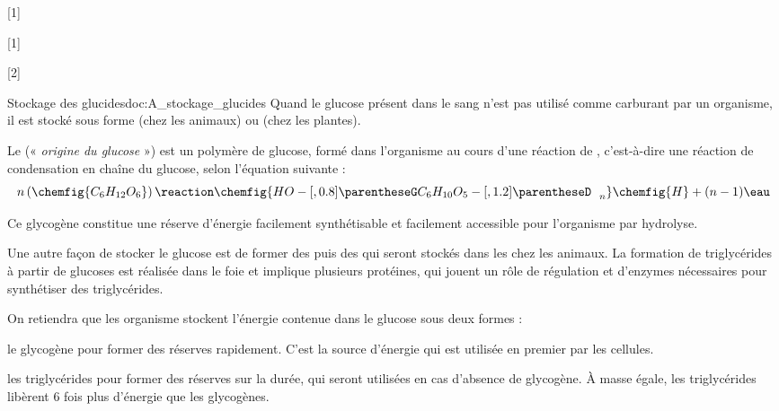[1]

[1]

[2]

\begin{doc}{Stockage des glucides}{doc:A_stockage_glucides}
  Quand le glucose présent dans le sang n'est pas utilisé comme carburant par un organisme, il est stocké sous forme  (chez les animaux) ou  (chez les plantes).

  Le  (« \textit{origine du glucose} ») est un polymère de glucose, formé dans l'organisme au cours d'une réaction de , c'est-à-dire une réaction de condensation en chaîne du glucose, selon l'équation suivante :
  \begin{equation*}
    n \left(\chemfig{C_6 H_{12} O_6}\right) \reaction
    \chemfig{HO-[,0.8] \parentheseG C_6 H_{10} O_5 -[,1.2]\parentheseD_{\phantom{B} n}}\chemfig{H}
    + (n-1)\eau
  \end{equation*}

  Ce glycogène constitue une réserve d'énergie facilement synthétisable et facilement accessible pour l'organisme par hydrolyse.

  Une autre façon de stocker le glucose est de former des  puis des  qui seront stockés dans les  chez les animaux.
  La formation de triglycérides à partir de glucoses est réalisée dans le foie et implique plusieurs protéines, qui jouent un rôle de régulation et d'enzymes nécessaires pour synthétiser des triglycérides.

  On retiendra que les organisme stockent l'énergie contenue dans le glucose sous deux formes :
  \begin{listePoints}
    \item le glycogène pour former des réserves rapidement. C'est la source d'énergie qui est utilisée en premier par les cellules.
    \item les triglycérides pour former des réserves sur la durée, qui seront utilisées en cas d'absence de glycogène. À masse égale, les triglycérides libèrent 6 fois plus d'énergie que les glycogènes.
  \end{listePoints}
\end{doc}